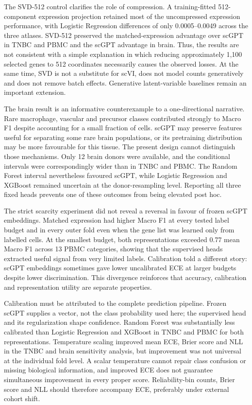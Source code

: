 The SVD-512 control clarifies the role of compression. A training-fitted 512-component expression projection retained most of the uncompressed expression performance, with Logistic Regression differences of only 0.0005--0.0049 across the three atlases. SVD-512 preserved the matched-expression advantage over scGPT in TNBC and PBMC and the scGPT advantage in brain. Thus, the results are not consistent with a simple explanation in which reducing approximately 1,100 selected genes to 512 coordinates necessarily causes the observed losses. At the same time, SVD is not a substitute for scVI, does not model counts generatively and does not remove batch effects. Generative latent-variable baselines remain an important extension.

The brain result is an informative counterexample to a one-directional narrative. Rare macrophage, vascular and precursor classes contributed strongly to Macro F1 despite accounting for a small fraction of cells. scGPT may preserve features useful for separating some rare brain populations, or its pretraining distribution may be more favourable for this tissue. The present design cannot distinguish those mechanisms. Only 12 brain donors were available, and the conditional intervals were correspondingly wider than in TNBC and PBMC. The Random Forest interval nevertheless favoured scGPT, while Logistic Regression and XGBoost remained uncertain at the donor-resampling level. Reporting all three fixed heads prevents one of these outcomes from being elevated post hoc.

The strict scarcity experiment did not reveal a reversal in favour of frozen scGPT embeddings. Matched expression had higher Macro F1 at every tested label budget and in every outer fold even when the gene list was learned only from labelled cells. At the smallest budget, both representations exceeded 0.77 mean Macro F1 across 13 PBMC categories, showing that the supervised heads extracted useful signal from very limited labels. Calibration told a different story: scGPT embeddings sometimes gave lower uncalibrated ECE at larger budgets despite lower discrimination. This divergence reinforces that accuracy, calibration and representation utility are separate properties.

Calibration must be attributed to the complete prediction pipeline. Frozen scGPT supplies a vector, not the class probability used here; the supervised head and its regularization shape confidence. Random Forest was substantially less calibrated than Logistic Regression and XGBoost in TNBC and PBMC for both representations. Temperature scaling improved mean ECE, Brier score and NLL in the TNBC and brain sensitivity analysis, but improvement was not universal at the individual fold level. A scalar temperature cannot repair class confusion or missing biological information, and improved ECE does not guarantee simultaneous improvement in every proper score. Reliability-bin counts, Brier score and NLL should therefore accompany ECE, preferably under external cohort shift.

